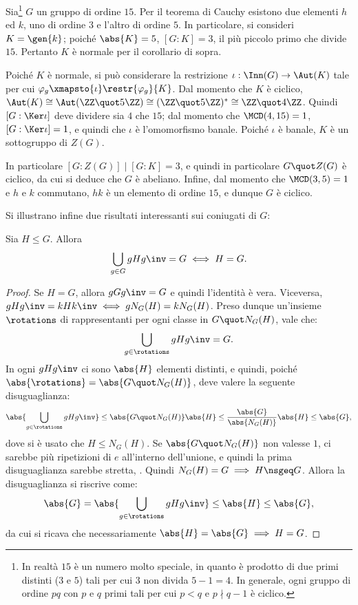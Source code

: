 \documentclass[12pt]{scrartcl}
\begin{document}
	\begin{example} 
		Sia\footnote{
			In realtà $15$ è un numero molto speciale, in quanto è prodotto
			di due primi distinti ($3$ e $5$) tali per cui $3$ non divida
			$5-1 = 4$. In generale, ogni gruppo di ordine $pq$ con
			$p$ e $q$ primi tali per cui $p<q$ e $p \nmid q-1$ è ciclico.
		} $G$ un gruppo di ordine $15$. Per il teorema di Cauchy esistono
		due elementi $h$ ed $k$, uno di ordine $3$ e l'altro di ordine $5$.
		In particolare, si consideri $K = \gen{k}$; poiché $\abs{K} = 5$,
		$[G : K] = 3$, il più piccolo primo che divide $15$. Pertanto
		$K$ è normale per il corollario di sopra. \medskip
		
		
		Poiché $K$ è normale, si può considerare la restrizione $\iota :
		\Inn(G) \to \Aut(K)$ tale per cui $\varphi_g \xmapsto{\iota} \restr{\varphi_g}{K}$.
		Dal momento che $K$ è ciclico, $\Aut(K) \cong \Aut(\ZZ \quot 5 \ZZ) \cong
		(\ZZ \quot 5 \ZZ)^* \cong \ZZ \quot 4 \ZZ$. Quindi $[G : \Ker \iota]$ deve
		dividere sia $4$ che $15$; dal momento che $\MCD(4, 15) = 1$, $[G : \Ker \iota] = 1$,
		e quindi che $\iota$ è l'omomorfismo banale. Poiché $\iota$ è banale, $K$ è
		un sottogruppo di $Z(G)$. \medskip
		
		
		In particolare $[G : Z(G)] \mid [G : K] = 3$, e quindi in particolare
		$G \quot Z(G)$ è ciclico, da cui si deduce che $G$ è abeliano. Infine,
		dal momento che $\MCD(3, 5) = 1$ e $h$ e $k$ commutano,
		$hk$ è un elemento di ordine $15$, e dunque $G$ è ciclico.
	\end{example}
	
	Si illustrano infine due risultati interessanti sui coniugati di $G$:
	
	\begin{proposition}
		Sia $H \leq G$. Allora
		\[ \bigcup_{g \in G} gHg\inv = G \iff H = G. \]
	\end{proposition}
	
	\begin{proof}
		Se $H = G$, allora $gGg\inv = G$ e quindi l'identità è vera. Viceversa,
		$gHg\inv = kHk\inv \iff g N_G(H) = k N_G(H)$. Preso dunque un'insieme
		$\rotations$ di rappresentanti per ogni classe in $G \quot N_G(H)$,
		vale che:
		\[ \bigcup_{g \in \rotations} gHg\inv = G. \]
		In ogni $gHg\inv$ ci sono $\abs{H}$ elementi distinti, e quindi, poiché
		$\abs{\rotations} = \abs{G \quot N_G(H)}$, deve valere la seguente
		disuguaglianza:
		\[ \abs{\bigcup_{g \in \rotations} gHg\inv} \leq \abs{G \quot N_G(H)} \abs{H} \leq
			\frac{\abs{G}}{\abs{N_G(H)}} \abs{H} \leq \abs{G}, \]
		dove si è usato che $H \leq N_G(H)$.
		Se $\abs{G \quot N_G(H)}$ non valesse $1$, ci sarebbe più ripetizioni di $e$
		all'interno dell'unione, e quindi la prima disuguaglianza sarebbe stretta,
		\Lightning. Quindi $N_G(H) = G \implies H \nsgeq G$. Allora la disuguaglianza
		si riscrive come:
		\[ \abs{G} = \abs{\bigcup_{g \in \rotations} gHg\inv} \leq \abs{H} \leq \abs{G}, \]
		da cui si ricava che necessariamente $\abs{H} = \abs{G} \implies H = G$.
	\end{proof}
	
\end{document}
